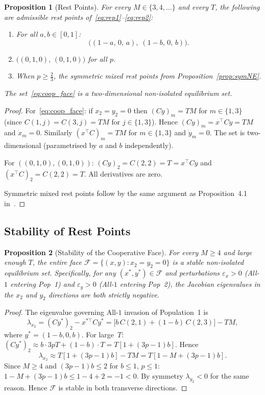 \documentclass[12pt,a4paper]{article}
\newtheorem{proposition}{Proposition}[section]
\begin{document}
\begin{proposition}[Rest Points]\label{prop:rest2pop}
For every $M\in\{3,4,\ldots\}$ and every $T$, the following are admissible rest
points of~\eqref{eq:rep1}--\eqref{eq:rep2}:
\begin{enumerate}
  \item For all $a,b\in[0,1]$:
        \begin{equation}\label{eq:coop_face}
          \bigl((1-a,\,0,\,a),\;(1-b,\,0,\,b)\bigr).
        \end{equation}
  \item $\bigl((0,1,0),\,(0,1,0)\bigr)$ for all $p$.
  \item When $p\geq\tfrac{2}{3}$, the symmetric mixed rest points from
        Proposition~\ref{prop:symNE}.
\end{enumerate}
The set~\eqref{eq:coop_face} is a two-dimensional non-isolated equilibrium set.
\end{proposition}

\begin{proof}
For~\eqref{eq:coop_face}: if $x_2=y_2=0$ then $(Cy)_m=TM$ for
$m\in\{1,3\}$ (since $C(1,j)=C(3,j)=TM$ for $j\in\{1,3\}$).  Hence
$(Cy)_m=x^\top Cy=TM$ and $\dot x_m=0$.  Similarly $(x^\top C)_m=TM$ for
$m\in\{1,3\}$ and $\dot y_m=0$.  The set is two-dimensional (parametrised
by $a$ and $b$ independently).

For $((0,1,0),(0,1,0))$: $(Cy)_2=C(2,2)=T=x^\top Cy$ and
$(x^\top C)_2=C(2,2)=T$.  All derivatives are zero.

Symmetric mixed rest points follow by the same argument as
Proposition~4.1 in~\cite{LK2026}.
\end{proof}

\subsection{Stability of Rest Points}

\begin{proposition}[Stability of the Cooperative Face]\label{prop:stabcoop}
For every $M\geq 4$ and large enough $T$, the entire face
$\mathcal{F}=\{(x,y):x_2=y_2=0\}$ is a stable non-isolated equilibrium set.
Specifically, for any $(x^*,y^*)\in\mathcal{F}$ and perturbations
$\varepsilon_x>0$ (All-$1$ entering Pop~1) and $\varepsilon_y>0$
(All-$1$ entering Pop~2), the Jacobian eigenvalues in the $x_2$ and $y_2$
directions are both strictly negative.
\end{proposition}

\begin{proof}
The eigenvalue governing All-$1$ invasion of Population~1 is
\[
  \lambda_{x_2} = (Cy^*)_2 - x^{*\top}Cy^*
  = \bigl[b\,C(2,1)+(1-b)\,C(2,3)\bigr] - TM,
\]
where $y^*=(1-b,0,b)$.  For large~$T$:
$(Cy^*)_2\approx b\cdot 3pT+(1-b)\cdot T=T[1+(3p-1)b]$.
Hence
\[
  \lambda_{x_2}\approx T[1+(3p-1)b]-TM = T[1-M+(3p-1)b].
\]
Since $M\geq 4$ and $(3p-1)b\leq 2$ for $b\leq 1$, $p\leq 1$:
$1-M+(3p-1)b \leq 1-4+2=-1<0$.  By symmetry $\lambda_{y_2}<0$ for the same
reason.  Hence $\mathcal{F}$ is stable in both transverse directions.
\end{proof}
\end{document}
